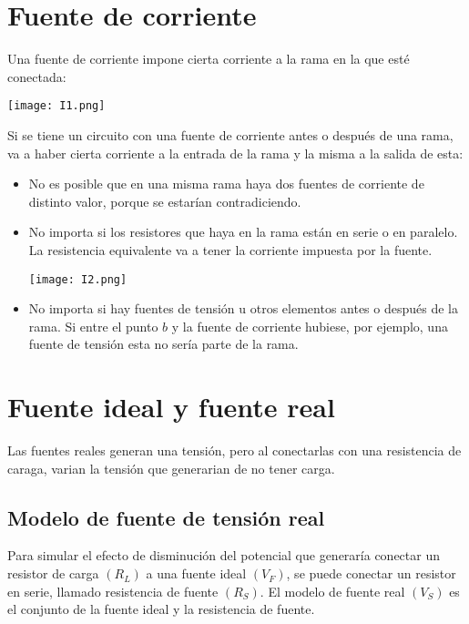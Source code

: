 \documentclass[a5paper,12pt,twoside]{book}
\begin{document}
\section{Fuente de corriente}

Una fuente de corriente impone cierta corriente a la rama en la que esté conectada:

\begin{center}
    \texttt{[image: I1.png]}
\end{center}

Si se tiene un circuito con una fuente de corriente antes o después de una rama, va a haber cierta corriente a la entrada de la rama y la misma a la salida de esta:

\begin{itemize}
\item No es posible que en una misma rama haya dos fuentes de corriente de distinto valor, porque se estarían contradiciendo.

\item No importa si los resistores que haya en la rama están en serie o en paralelo. La resistencia equivalente va a tener la corriente impuesta por la fuente.

\begin{center}
    \texttt{[image: I2.png]}
\end{center}

\item No importa si hay fuentes de tensión u otros elementos antes o después de la rama. Si entre el punto $b$ y la fuente de corriente hubiese, por ejemplo, una fuente de tensión esta no sería parte de la rama.
\end{itemize}


\section{Fuente ideal y fuente real}

Las fuentes reales generan una tensión, pero al conectarlas con una resistencia de caraga, varian la tensión que generarian de no tener carga.


\subsection*{Modelo de fuente de tensión real}

Para simular el efecto de disminución del potencial que generaría conectar un resistor de carga $(R_L)$ a una fuente ideal $(V_F)$, se puede conectar un resistor en serie, llamado resistencia de fuente $(R_S)$. El modelo de fuente real $(V_S)$ es el conjunto de la fuente ideal y la resistencia de fuente.
\end{document}
